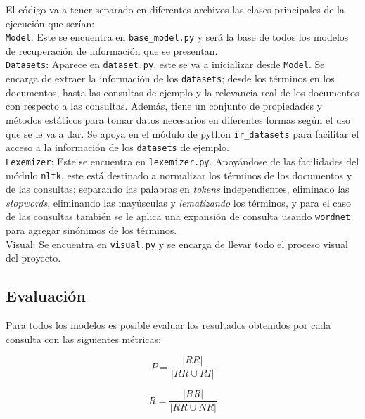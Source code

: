 \documentclass[spanish]{article}
\begin{document}
		
		El código va a tener separado en diferentes archivos las clases principales de la ejecución que serían:\\

		\texttt{Model}: Este se encuentra en \texttt{base\_model.py} y será la base de todos los modelos de recuperación de información que se presentan.\\

		\texttt{Datasets}: Aparece en \texttt{dataset.py}, este se va a inicializar desde \texttt{Model}. Se encarga de extraer la información de los \texttt{datasets}; desde los términos en los documentos, hasta las consultas de ejemplo y la relevancia real de los documentos con respecto a las consultas. Además, tiene un conjunto de propiedades y métodos estáticos para tomar datos necesarios en diferentes formas según el uso que se le va a dar. Se apoya en el módulo de python \texttt{ir\_datasets} para facilitar el acceso a la información de los \texttt{datasets} de ejemplo.\\

		\texttt{Lexemizer}: Este se encuentra en \texttt{lexemizer.py}. Apoyándose de las facilidades del módulo \texttt{nltk}, este está destinado a normalizar los términos de los documentos y de las consultas; separando las palabras en \emph{tokens} independientes, eliminado las \emph{stopwords}, eliminando las mayúsculas y \emph{lematizando} los términos, y para el caso de las consultas también se le aplica una expansión de consulta usando \texttt{wordnet} para agregar sinónimos de los términos.\\

		Visual: Se encuentra en \texttt{visual.py} y se encarga de llevar todo el proceso visual del proyecto.

		\subsection*{Evaluación}

			Para todos los modelos es posible evaluar los resultados obtenidos por cada consulta con las siguientes métricas:
		
		\begin{equation}
			\displaystyle P = \frac{|RR| }{| RR \cup  RI |}
		\end{equation}

		\begin{equation}
			\displaystyle R = \frac{|RR| }{| RR \cup  NR |}
		\end{equation}
\end{document}
